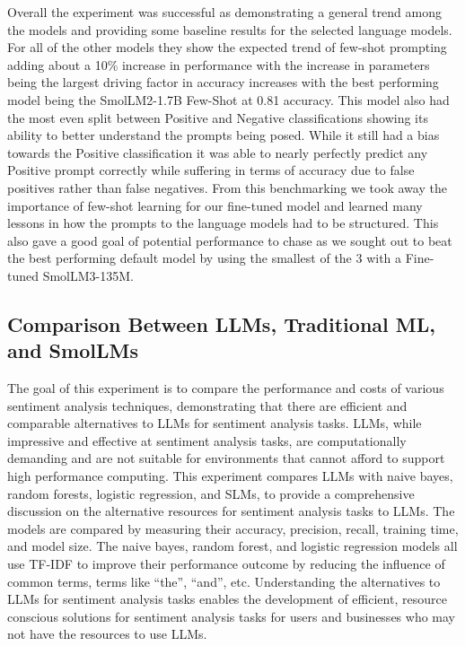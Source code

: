 \documentclass[10pt,twocolumn,letterpaper]{article}
\begin{document}
Overall the experiment was successful as demonstrating a general trend among the models and providing some baseline results for the selected language models. For all of the other models they show the expected trend of few-shot prompting adding about a 10\% increase in performance with the increase in parameters being the largest driving factor in accuracy increases with the best performing model being the SmolLM2-1.7B Few-Shot at 0.81 accuracy. This model also had the most even split between Positive and Negative classifications showing its ability to better understand the prompts being posed. While it still had a bias towards the Positive classification it was able to nearly perfectly predict any Positive prompt correctly while suffering in terms of accuracy due to false positives rather than false negatives. From this benchmarking we took away the importance of few-shot learning for our fine-tuned model and learned many lessons in how the prompts to the language models had to be structured. This also gave a good goal of potential performance to chase as we sought out to beat the best performing default model by using the smallest of the 3 with a Fine-tuned SmolLM3-135M. 


\subsection{Comparison Between LLMs, Traditional ML, and SmolLMs}
The goal of this experiment is to compare the performance and costs of various sentiment analysis techniques, demonstrating that there are efficient and comparable alternatives to LLMs for sentiment analysis tasks. LLMs, while impressive and effective at sentiment analysis tasks, are computationally demanding and are not suitable for environments that cannot afford to support high performance computing. This experiment compares LLMs with naive bayes, random forests, logistic regression, and SLMs, to provide a comprehensive discussion on the alternative resources for sentiment analysis tasks to LLMs. The models are compared by measuring their accuracy, precision, recall, training time, and model size. The naive bayes, random forest, and logistic regression models all use TF-IDF to improve their performance outcome by reducing the influence of common terms, terms like “the”, “and”, etc. Understanding the alternatives to LLMs for sentiment analysis tasks enables the development of efficient, resource conscious solutions for sentiment analysis tasks for users and businesses who may not have the resources to use LLMs.
\end{document}
